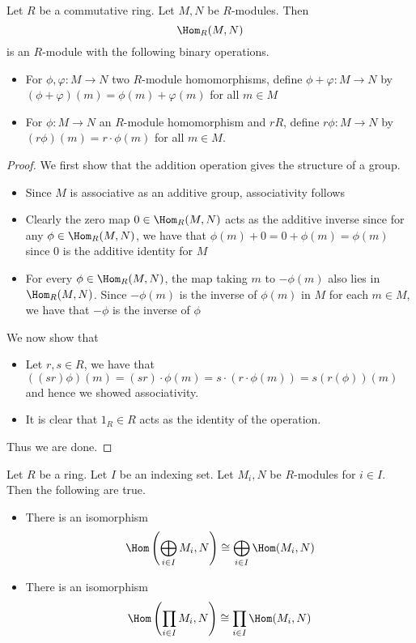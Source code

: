 \documentclass[a4paper]{article}
\begin{document}
\begin{prp}{}{} Let $R$ be a commutative ring. Let $M,N$ be $R$-modules. Then $$\Hom_R(M,N)$$ is an $R$-module with the following binary operations. 
\begin{itemize}
\item For $\phi,\varphi:M\to N$ two $R$-module homomorphisms, define $\phi+\varphi:M\to N$ by $(\phi+\varphi)(m)=\phi(m)+\varphi(m)$ for all $m\in M$
\item For $\phi:M\to N$ an $R$-module homomorphism and $r R$, define $r\phi:M\to N$ by $(r\phi)(m)=r\cdot\phi(m)$ for all $m\in M$. 
\end{itemize} 
\begin{proof}
We first show that the addition operation gives the structure of a group. 
\begin{itemize}
\item Since $M$ is associative as an additive group, associativity follows
\item Clearly the zero map $0\in\Hom_R(M,N)$ acts as the additive inverse since for any $\phi\in\Hom_R(M,N)$, we have that $\phi(m)+0=0+\phi(m)=\phi(m)$ since $0$ is the additive identity for $M$
\item For every $\phi\in\Hom_R(M,N)$, the map taking $m$ to $-\phi(m)$ also lies in $\Hom_R(M,N)$. Since $-\phi(m)$ is the inverse of $\phi(m)$ in $M$ for each $m\in M$, we have that $-\phi$ is the inverse of $\phi$
\end{itemize}
We now show that 
\begin{itemize}
\item Let $r,s\in R$, we have that $((sr)\phi)(m)=(sr)\cdot\phi(m)=s\cdot(r\cdot\phi(m))=s(r(\phi))(m)$ and hence we showed associativity. 
\item It is clear that $1_R\in R$ acts as the identity of the operation. 
\end{itemize}
Thus we are done. 
\end{proof}
\end{prp}

\begin{prp}{}{} Let $R$ be a ring. Let $I$ be an indexing set. Let $M_i,N$ be $R$-modules for $i\in I$. Then the following are true. 
\begin{itemize}
\item There is an isomorphism $$\Hom\left(\bigoplus_{i\in I}M_i,N\right)\cong\bigoplus_{i\in I}\Hom(M_i,N)$$
\item There is an isomorphism $$\Hom\left(\prod_{i\in I}M_i,N\right)\cong\prod_{i\in I}\Hom(M_i,N)$$
\end{itemize} 
\end{prp}
\end{document}
